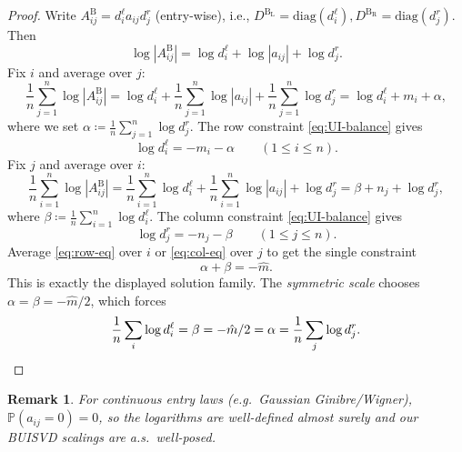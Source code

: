 \documentclass[11pt,a4paper]{article}
\newtheorem{remark}{Remark}[section]
\newcommand{\diag}{\mathrm{diag}}
\newcommand{\Prob}{\mathbb{P}}
\begin{document}
\begin{proof}
Write $A^\mathrm{B}_{ij}=d^\ell_i a_{ij} {d^r_j}$ (entry-wise), i.e., $D^\mathrm{B_L}=\diag(d^\ell_i),D^\mathrm{B_R}=\diag({d^r_j})$. Then
\begin{equation}
\log|A^\mathrm{B}_{ij}|=\log d^\ell_i+\log|a_{ij}|+\log {d^r_j}.
\end{equation}
Fix $i$ and average over $j$:
\begin{equation}
\frac1n\sum_{j=1}^n \log|A^\mathrm{B}_{ij}|
= \log d^\ell_i+\frac1n\sum_{j=1}^n\log|a_{ij}|+\frac1n\sum_{j=1}^n\log {d^r_j}
= \log d^\ell_i+m_i+\alpha,
\end{equation}
where we set $\alpha\coloneq \frac1n\sum_{j=1}^n \log {d^r_j}$. The row constraint \cref{eq:UI-balance} gives
\begin{equation}\label{eq:row-eq}
\log d^\ell_i=-m_i-\alpha\qquad(1\le i\le n).
\end{equation}
Fix $j$ and average over $i$:
\begin{equation}
\frac1n\sum_{i=1}^n \log|A^\mathrm{B}_{ij}|
= \frac1n\sum_{i=1}^n\log d^\ell_i+\frac1n\sum_{i=1}^n\log|a_{ij}|+\log {d^r_j}
= \beta+n_j+\log {d^r_j},
\end{equation}
where $\beta\coloneq \frac1n\sum_{i=1}^n \log d^\ell_i$. The column constraint \cref{eq:UI-balance} gives
\begin{equation}\label{eq:col-eq}
\log {d^r_j}=-n_j-\beta\qquad(1\le j\le n).
\end{equation}
Average \cref{eq:row-eq} over $i$ or \cref{eq:col-eq} over $j$ to get the single constraint
\begin{equation}
\alpha+\beta=-\hat{m}.
\end{equation}
This is exactly the displayed solution family. The \emph{symmetric scale} chooses $\alpha=\beta=-\hat{m}/2$, which forces
\begin{equation}
\frac1n\sum_i \log d^\ell_i=\beta=-\hat{m}/2=\alpha=\frac1n\sum_j \log {d^r_j}.\qedhere
\end{equation}
\end{proof}
\begin{remark}
For continuous entry laws (e.g.\ Gaussian Ginibre/Wigner), $\Prob(a_{ij}=0)=0$, so the logarithms are well-defined almost surely and our BUISVD scalings are a.s.\ well-posed. 
\end{remark}
\end{document}
